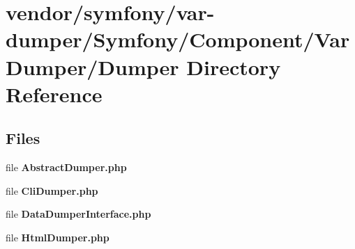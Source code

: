 \section{vendor/symfony/var-\/dumper/\+Symfony/\+Component/\+Var\+Dumper/\+Dumper Directory Reference}
\label{dir_e11f3b2286a1c268a3704d733c8bfdcc}
\subsection*{Files}
\begin{DoxyCompactItemize}
\item 
file {\bf Abstract\+Dumper.\+php}
\item 
file {\bf Cli\+Dumper.\+php}
\item 
file {\bf Data\+Dumper\+Interface.\+php}
\item 
file {\bf Html\+Dumper.\+php}
\end{DoxyCompactItemize}
